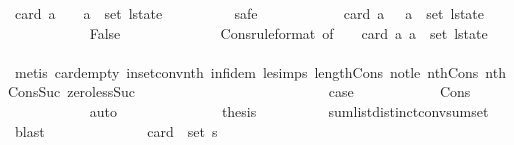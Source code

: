 \begin{isabellebody}
\ {\isachardoublequoteopen}card\ a\ {\isachargreater}\ {}\ {\isasymlongrightarrow}\ a\ {\isasymnotin}\ set\ l{\isacharunderscore}state{\isachardoublequoteclose}\isanewline
\ \ \ \ \ \ \ \ \isamarkupfalse%
\ safe\isanewline
\ \ \ \ \ \ \ \ \ \ \isamarkupfalse%
\ {\isachardoublequoteopen}card\ a\ {\isachargreater}\ {}{\isachardoublequoteclose}\ {\isachardoublequoteopen}a\ {\isasymin}\ set\ l{\isacharunderscore}state{\isachardoublequoteclose}\isanewline
\ \ \ \ \ \ \ \ \ \ \isamarkupfalse%
\ False\isanewline
\ \ \ \ \ \ \ \ \ \ \ \ \isamarkupfalse%
\ Cons{\isacharparenleft}{}{\isacharparenright}{\isacharbrackleft}rule{\isacharunderscore}format{\isacharcomma}\ of\ {}{\isacharbrackright}\ {\isacartoucheopen}{}\ {\isacharless}\ card\ a{\isacartoucheclose}\ {\isacartoucheopen}a\ {\isasymin}\ set\ l{\isacharunderscore}state{\isacartoucheclose}\ \isanewline
\ \ \ \ \ \ \ \ \ \ \ \ \isamarkupfalse%
\ {\isacharparenleft}metis\ card{\isacharunderscore}empty\ in{\isacharunderscore}set{\isacharunderscore}conv{\isacharunderscore}nth\ inf{\isachardot}idem\ le{\isacharunderscore}simps{\isacharparenleft}{}{\isacharparenright}\ length{\isacharunderscore}Cons\ not{\isacharunderscore}le\ nth{\isacharunderscore}Cons{\isacharunderscore}{}\ nth{\isacharunderscore}Cons{\isacharunderscore}Suc\ zero{\isacharunderscore}less{\isacharunderscore}Suc{\isacharparenright}\isanewline
\ \ \ \ \ \ \ \ \isamarkupfalse%
\isanewline
\ \ \ \ \ \ \ \ \isamarkupfalse%
\isanewline
\ \ \ \ \ \ \ \ \isamarkupfalse%
\ {\isacharquery}case\isanewline
\ \ \ \ \ \ \ \ \ \ \isamarkupfalse%
\ Cons\isanewline
\ \ \ \ \ \ \ \ \ \ \isamarkupfalse%
\ auto\isanewline
\ \ \ \ \ \ \isamarkupfalse%
\isanewline
\ \ \ \ \ \ \isamarkupfalse%
\ {\isacharquery}thesis\isanewline
\ \ \ \ \ \ \ \ \isamarkupfalse%
\ sum{\isacharunderscore}list{\isacharunderscore}distinct{\isacharunderscore}conv{\isacharunderscore}sum{\isacharunderscore}set\ \isamarkupfalse%
\ blast\isanewline
\ \ \ \ \isamarkupfalse%
\isanewline
\ \ \ \ \isamarkupfalse%
\ \isamarkupfalse%
\ {\isachardoublequoteopen}{\isachardot}{\isachardot}{\isachardot}\ {\isacharequal}\ card\ {\isacharparenleft}{\isasymUnion}\ {\isacharparenleft}set\ {\isacharquery}s{\isacharparenright}{\isacharparenright}{\isachardoublequoteclose}\isanewline

\end{isabellebody}
